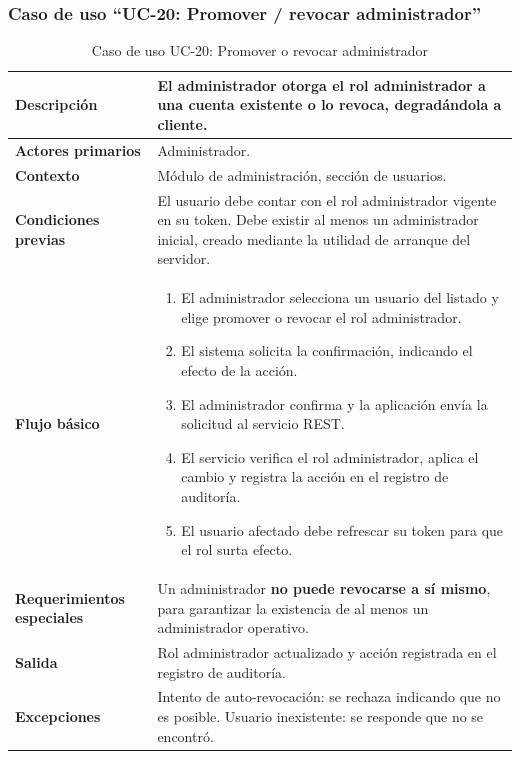\documentclass[doc,12pt,a4paper]{apa7}
\begin{document}
\subsubsection{Caso de uso ``UC-20: Promover / revocar administrador''}

\begin{longtable}{|P{3.3cm}|L{11.2cm}|}
\caption{Caso de uso UC-20: Promover o revocar administrador}\\
\hline
\textbf{Descripción} & El administrador otorga el rol administrador a una cuenta existente o lo revoca, degradándola a cliente. \\ \hline
\textbf{Actores primarios} & Administrador. \\ \hline
\textbf{Contexto} & Módulo de administración, sección de usuarios. \\ \hline
\textbf{Condiciones previas} & El usuario debe contar con el rol administrador vigente en su token. Debe existir al menos un administrador inicial, creado mediante la utilidad de arranque del servidor. \\ \hline
\textbf{Flujo básico} &
\begin{enumerate}
    \item El administrador selecciona un usuario del listado y elige promover o revocar el rol administrador.
    \item El sistema solicita la confirmación, indicando el efecto de la acción.
    \item El administrador confirma y la aplicación envía la solicitud al servicio REST.
    \item El servicio verifica el rol administrador, aplica el cambio y registra la acción en el registro de auditoría.
    \item El usuario afectado debe refrescar su token para que el rol surta efecto.
\end{enumerate} \\ \hline
\textbf{Requerimientos especiales} & Un administrador \textbf{no puede revocarse a sí mismo}, para garantizar la existencia de al menos un administrador operativo. \\ \hline
\textbf{Salida} & Rol administrador actualizado y acción registrada en el registro de auditoría. \\ \hline
\textbf{Excepciones} & Intento de auto-revocación: se rechaza indicando que no es posible. Usuario inexistente: se responde que no se encontró. \\ \hline
\end{longtable}
\end{document}
